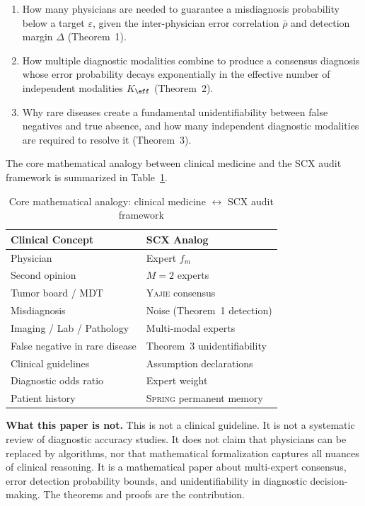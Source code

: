 \documentclass[11pt,a4paper]{article}
\theoremstyle{definition}
\newcommand{\Yajie}{\textsc{Yajie}}
\newcommand{\Spring}{\textsc{Spring}}
\newcommand{\SCX}{\textsc{SCX}}
\begin{document}
\begin{enumerate}[label=(\roman*)]
    \item How many physicians are needed to guarantee a misdiagnosis probability
    below a target $\varepsilon$, given the inter-physician error correlation $\bar{\rho}$
    and detection margin $\Delta$ (Theorem~1).
    \item How multiple diagnostic modalities combine to produce a consensus
    diagnosis whose error probability decays exponentially in the effective
    number of independent modalities $K_{\eff}$ (Theorem~2).
    \item Why rare diseases create a fundamental unidentifiability between false
    negatives and true absence, and how many independent diagnostic modalities
    are required to resolve it (Theorem~3).
\end{enumerate}

The core mathematical analogy between clinical medicine and the \SCX{} audit
framework is summarized in Table~\ref{tab:analogy}.

\begin{table}[ht]
\centering
\caption{Core mathematical analogy: clinical medicine $\leftrightarrow$ SCX audit framework}
\label{tab:analogy}
\begin{tabular}{@{}ll@{}}
\toprule
\textbf{Clinical Concept} & \textbf{SCX Analog} \\
\midrule
Physician & Expert $f_m$ \\
Second opinion & $M=2$ experts \\
Tumor board / MDT & \Yajie{} consensus \\
Misdiagnosis & Noise (Theorem~1 detection) \\
Imaging / Lab / Pathology & Multi-modal experts \\
False negative in rare disease & Theorem~3 unidentifiability \\
Clinical guidelines & Assumption declarations \\
Diagnostic odds ratio & Expert weight \\
Patient history & \Spring{} permanent memory \\
\bottomrule
\end{tabular}
\end{table}

\medskip
\noindent\textbf{What this paper is not.} This is not a clinical guideline.
It is not a systematic review of diagnostic accuracy studies. It does not
claim that physicians can be replaced by algorithms, nor that mathematical
formalization captures all nuances of clinical reasoning. It is a mathematical
paper about multi-expert consensus, error detection probability bounds, and
unidentifiability in diagnostic decision-making. The theorems and proofs are
the contribution.
\end{document}
